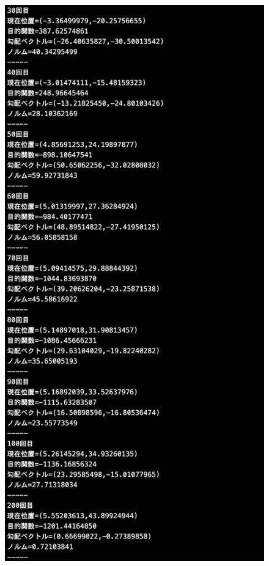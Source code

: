 \documentclass[12pt]{jarticle}
\begin{document}
\begin{figure}[h]
    \begin{minipage}{0.5\hsize}
        \begin{center}
            \includegraphics[scale=0.2]{kadai1_2s_out1_2_2.png}
        \end{center}

\end{minipage}
\end{figure}
\end{document}
